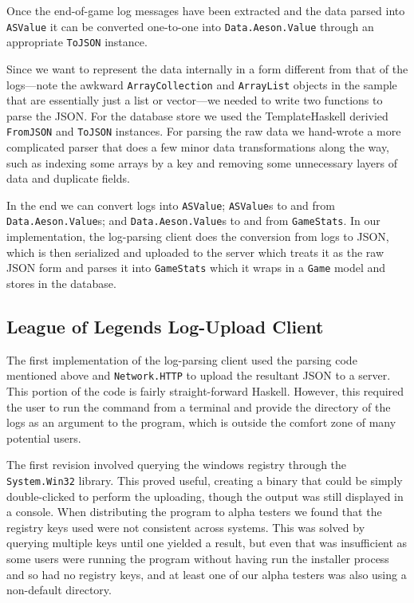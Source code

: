 \documentclass[letterpaper,twocolumn,9pt]{article}
\newcommand{\code}[1]{\texttt{#1}}
\begin{document}
Once the end-of-game log messages have been extracted and the data parsed into \code{ASValue} it can be converted one-to-one into \code{Data.Aeson.Value} through an appropriate \code{ToJSON} instance.

Since we want to represent the data internally in a form different from that of the logs---note the awkward \code{ArrayCollection} and \code{ArrayList} objects in the sample that are essentially just a list or vector---we needed to write two functions to parse the JSON.  For the database store we used the TemplateHaskell derivied \code{FromJSON} and \code{ToJSON} instances.  For parsing the raw data we hand-wrote a more complicated parser that does a few minor data transformations along the way, such as indexing some arrays by a key and removing some unnecessary layers of data and duplicate fields.

In the end we can convert logs into \code{ASValue}; \code{ASValue}s to and from \code{Data.Aeson.Value}s; and \code{Data.Aeson.Value}s to and from \code{GameStats}.  In our implementation, the log-parsing client does the conversion from logs to JSON, which is then serialized and uploaded to the server which treats it as the raw JSON form and parses it into \code{GameStats} which it wraps in a \code{Game} model and stores in the database.

\subsection{League of Legends Log-Upload Client}

The first implementation of the log-parsing client used the parsing code mentioned above and \code{Network.HTTP} to upload the resultant JSON to a server.  This portion of the code is fairly straight-forward Haskell.  However, this required the user to run the command from a terminal and provide the directory of the logs as an argument to the program, which is outside the comfort zone of many potential users.

The first revision involved querying the windows registry through the \code{System.Win32} library.  This proved useful, creating a binary that could be simply double-clicked to perform the uploading, though the output was still displayed in a console.  When distributing the program to alpha testers we found that the registry keys used were not consistent across systems.  This was solved by querying multiple keys until one yielded a result, but even that was insufficient as some users were running the program without having run the installer process and so had no registry keys, and at least one of our alpha testers was also using a non-default directory.
\end{document}

